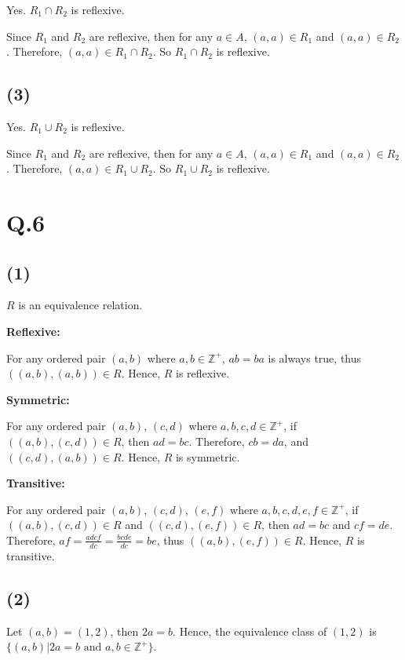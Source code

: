 \documentclass[a4paper,12pt]{article}
\begin{document}
Yes. 
$R_1 \cap R_2$ is reflexive.

Since $R_1$ and $R_2$ are reflexive, then for any $a \in A$, $(a, a) \in R_1$ and $(a, a) \in R_2$.
Therefore, $(a, a) \in R_1 \cap R_2$. So $R_1 \cap R_2$ is reflexive.

\subsection*{(3)}

Yes. 
$R_1 \cup R_2$ is reflexive.

Since $R_1$ and $R_2$ are reflexive, then for any $a \in A$, $(a, a) \in R_1$ and $(a, a) \in R_2$.
Therefore, $(a, a) \in R_1 \cup R_2$. So $R_1 \cup R_2$ is reflexive.

\section*{Q.6}

\subsection*{(1)}

$R$ is an equivalence relation.

\textbf{Reflexive:} 

For any ordered pair $(a, b)$ where $a, b \in \mathbb{Z^+}$, $ab = ba$ is always true, thus $((a, b), (a, b)) \in R$.
Hence, $R$ is reflexive.

\textbf{Symmetric:}

For any ordered pair $(a, b)$, $(c, d)$ where $a, b, c, d \in \mathbb{Z^+}$, if $((a, b), (c, d)) \in R$, then $ad = bc$.
Therefore, $cb = da$, and $((c, d), (a, b)) \in R$.
Hence, $R$ is symmetric.

\textbf{Transitive:}

For any ordered pair $(a, b)$, $(c, d)$, $(e, f)$ where $a, b, c, d, e, f \in \mathbb{Z^+}$, if $((a, b), (c, d)) \in R$ and $((c, d), (e, f)) \in R$, then $ad = bc$ and $cf = de$.
Therefore, $af = \frac{adcf}{dc} = \frac{bcde}{dc} = be$, thus $((a, b), (e, f)) \in R$.
Hence, $R$ is transitive.

\subsection*{(2)}

Let $(a, b) = (1, 2)$, then $2a = b$.
Hence, the equivalence class of $(1, 2)$ is $\{(a, b) | 2a = b \text{ and } a, b \in \mathbb{Z^+}\}$.
\end{document}
